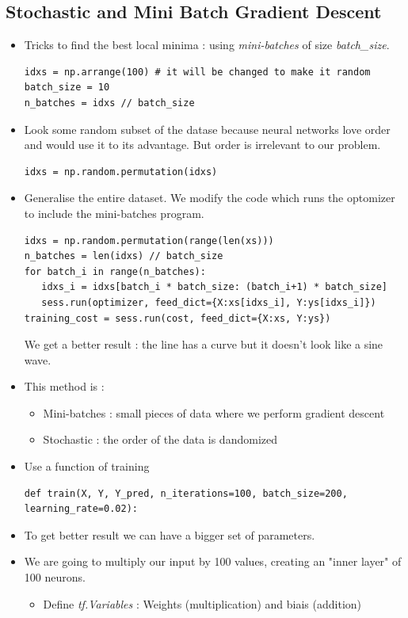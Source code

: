 \documentclass[12pt,a4paper]{article}
\begin{document}
\subsection{Stochastic and Mini Batch Gradient Descent}
\begin{itemize}
\item Tricks to find the best local minima : using \textit{mini-batches} of size \textit{batch\_size}.
\begin{lstlisting}
idxs = np.arrange(100) # it will be changed to make it random
batch_size = 10
n_batches = idxs // batch_size
\end{lstlisting}
\item Look some random subset of the datase because neural networks love order and would use it to its advantage. But order is irrelevant to our problem.
\begin{lstlisting}
idxs = np.random.permutation(idxs)
\end{lstlisting}
\item Generalise the entire dataset. We modify the code which runs the optomizer to include the mini-batches program.
\begin{lstlisting}
idxs = np.random.permutation(range(len(xs)))
n_batches = len(idxs) // batch_size
for batch_i in range(n_batches):
   idxs_i = idxs[batch_i * batch_size: (batch_i+1) * batch_size]
   sess.run(optimizer, feed_dict={X:xs[idxs_i], Y:ys[idxs_i]})
training_cost = sess.run(cost, feed_dict={X:xs, Y:ys})
\end{lstlisting}
We get a better result : the line has a curve but it doesn't look like a sine wave.
\item This method is :
\begin{itemize}
\item Mini-batches : small pieces of data where we perform gradient descent
\item Stochastic : the order of the data is dandomized
\end{itemize}
\item Use a function of training
\begin{lstlisting}
def train(X, Y, Y_pred, n_iterations=100, batch_size=200, learning_rate=0.02):
\end{lstlisting}
\item To get better result we can have a bigger set of parameters.
\item We are going to multiply our input by 100 values, creating an "inner layer" of 100 neurons.
\begin{itemize}
\item Define \textit{tf.Variables} : Weights (multiplication) and biais (addition)

\end{itemize}
\end{itemize}
\end{document}
